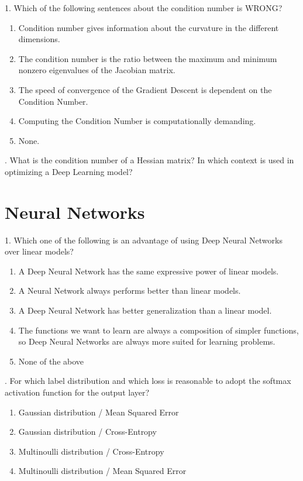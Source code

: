 1. Which of the following sentences about the condition number is WRONG?

\begin{enumerate}[label=\roman*]
    \item Condition number gives information about the curvature in the different dimensions.
    \item The condition number is the ratio between the maximum and minimum nonzero eigenvalues of the Jacobian matrix.
    \item The speed of convergence of the Gradient Descent is dependent on the Condition Number.
    \item Computing the Condition Number is computationally demanding.
    \item None. 
\end{enumerate}

. What is the condition number of a Hessian matrix? In which context is used in optimizing a Deep Learning model?

\newpage
\section{Neural Networks}

1. Which one of the following is an advantage of using Deep Neural Networks over linear models?

\begin{enumerate}[label=\roman*]
    \item A Deep Neural Network has the same expressive power of linear models.
    \item A Neural Network always performs better than linear models.
    \item A Deep Neural Network has better generalization than a linear model.
    \item The functions we want to learn are always a composition of simpler functions, so Deep Neural Networks are always more suited for learning problems.
    \item None of the above
\end{enumerate}

. For which label distribution and which loss is reasonable to adopt the softmax activation function for the output layer?

\begin{enumerate}[label=\roman*]
    \item Gaussian distribution / Mean Squared Error
    \item Gaussian distribution / Cross-Entropy
    \item Multinoulli distribution / Cross-Entropy
    \item Multinoulli distribution / Mean Squared Error
\end{enumerate}


